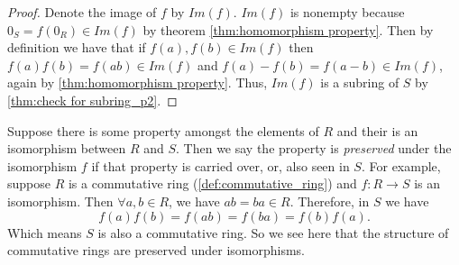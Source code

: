 \documentclass[../main.tex]{subfiles}
\begin{document}
\begin{proof}
Denote the image of $f$ by $Im(f)$. $Im(f)$ is nonempty because 
$0_S = f(0_R) \in Im(f)$ by theorem \ref{thm:homomorphism property}.
Then by definition we have that if $f(a), f(b) \in Im(f)$ then 
$f(a)f(b) = f(ab) \in Im(f)$ and $f(a) - f(b) = f(a-b) \in Im(f)$, again by \ref{thm:homomorphism property}. Thus, $Im(f)$ is a subring of $S$ by \ref{thm:check for subring_p2}.

\end{proof}

\begin{remark}
Suppose there is some property amongst the elements of $R$ and their is 
an isomorphism between $R$ and $S$. Then we say the property is \textit{preserved}
under the isomorphism $f$ if that property is carried over, or, also seen in $S$.
For example, suppose $R$ is a commutative ring (\ref{def:commutative_ring}) and $f: R \to S$
is an isomorphism. Then $\forall a,b \in R$, we have $ab = ba \in R$. Therefore, in $S$ we have \[
f(a)f(b) = f(ab) = f(ba) = f(b)f(a).
\]
Which means $S$ is also a commutative ring. So we see here that the structure of commutative rings are preserved under isomorphisms.
\end{remark}
\end{document}

